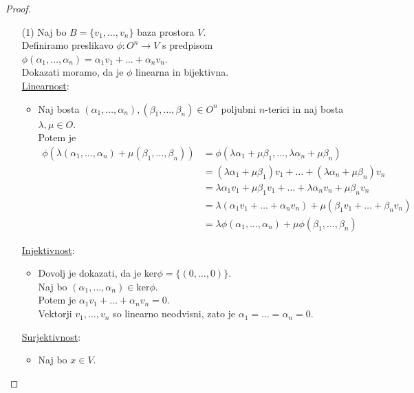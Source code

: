 \documentclass[a4paper,12pt]{article}
\begin{document}
\begin{proof}~

\begin{enumerate}
\item[(1)] Naj bo $B=\{v_1,\ldots,v_n\}$ baza prostora $V$.\\

Definiramo preslikavo $\phi:O^n\to V$ s predpisom $\phi(\alpha_1,\ldots,\alpha_n)=\alpha_1v_1+\ldots+\alpha_nv_n$. \\

Dokazati moramo, da je $\phi$ linearna in bijektivna. \\

\underline{Linearnost}:
\begin{itemize}
\item Naj bosta $(\alpha_1,\ldots,\alpha_n),(\beta_1,\ldots,\beta_n)\in O^n$ poljubni $n$-terici in naj bosta $\lambda,\mu\in O$. \\

Potem je
\begin{align*}
\phi(\lambda(\alpha_1,\ldots,\alpha_n)+\mu(\beta_1,\ldots,\beta_n)) & = \phi(\lambda \alpha_1+\mu \beta_1,\ldots,\lambda \alpha_n+\mu \beta_n) \\
& = (\lambda \alpha_1+\mu \beta_1)v_1+\ldots+(\lambda \alpha_n+\mu \beta_n)v_n \\
& = \lambda \alpha_1 v_1+\mu \beta_1v_1+\ldots+\lambda \alpha_n v_n+\mu \beta_n v_n \\
& = \lambda (\alpha_1 v_1+\ldots+\alpha_nv_n)+\mu(\beta_1v_1+\ldots+\beta_nv_n) \\
& = \lambda \phi(\alpha_1,\ldots,\alpha_n)+\mu \phi(\beta_1,\ldots,\beta_n)
\end{align*}
\end{itemize}

\underline{Injektivnost}: 
\begin{itemize}
\item Dovolj je dokazati, da je ker$\phi=\{(0,\ldots,0)\}$. \\

Naj bo $(\alpha_1,\ldots,\alpha_n)\in \text{ker}\phi$. \\

Potem je $\alpha_1v_1+\ldots+\alpha_nv_n=0$. \\

Vektorji $v_1,\ldots,v_n$ so linearno neodvisni, zato je $\alpha_1=\ldots=\alpha_n=0$.
\end{itemize}

\underline{Surjektivnost}:
\begin{itemize}
\item Naj bo $x\in V$. \\


\end{itemize}
\end{enumerate}
\end{proof}
\end{document}
